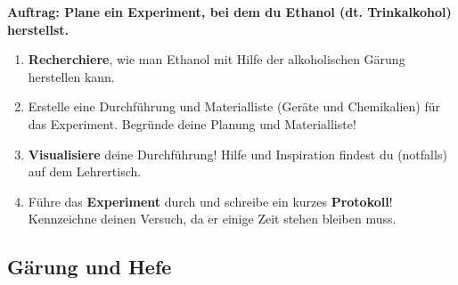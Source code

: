 \documentclass{scrartcl}  %
\begin{document}
				\textbf{Auftrag: Plane ein Experiment, bei dem du Ethanol (dt. Trinkalkohol) herstellst.}
				\begin{enumerate}
					\item \textbf{Recherchiere}, wie man Ethanol mit Hilfe der alkoholischen Gärung herstellen kann.
					\item Erstelle eine Durchführung und Materialliste (Geräte und Chemikalien) für das Experiment. Begründe deine Planung und Materialliste! 
					\item \textbf{Visualisiere} deine Durchführung! Hilfe und Inspiration findest du (notfalls) auf dem Lehrertisch.
					\item Führe das \textbf{Experiment} durch und schreibe ein kurzes \textbf{Protokoll}! Kennzeichne deinen Versuch, da er einige Zeit stehen bleiben muss.
				\end{enumerate}

			\subsection{Gärung und Hefe}			
\end{document}
